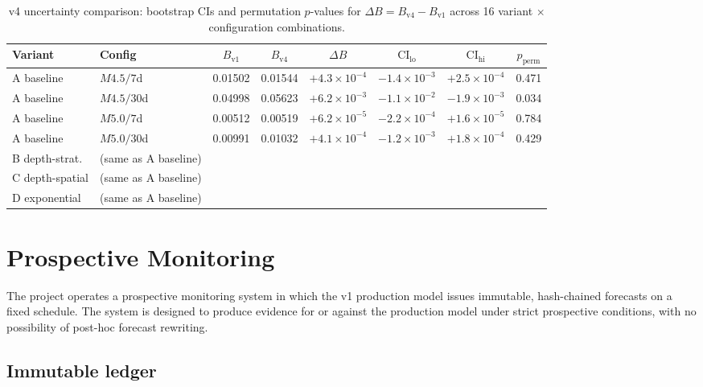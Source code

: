 \documentclass[10pt,a4paper,twocolumn]{article}
\begin{document}
\begin{table}[t]
\centering
\caption{v4 uncertainty comparison: bootstrap CIs and permutation $p$-values for $\Delta B = B_{\text{v4}} - B_{\text{v1}}$ across 16 variant $\times$ configuration combinations.}\label{tab:v4-uncertainty}
\small
\begin{tabular*}{\textwidth}{@{\extracolsep{\fill}}llcccccc}
\toprule
Variant & Config & $B_{\text{v1}}$ & $B_{\text{v4}}$ & $\Delta B$ & $\text{CI}_{\text{lo}}$ & $\text{CI}_{\text{hi}}$ & $p_{\text{perm}}$ \\
\midrule
A baseline        & $M4.5/7$d  & 0.01502 & 0.01544 & $+4.3\times10^{-4}$ & $-1.4\times10^{-3}$ & $+2.5\times10^{-4}$ & 0.471 \\
A baseline        & $M4.5/30$d & 0.04998 & 0.05623 & $+6.2\times10^{-3}$ & $-1.1\times10^{-2}$ & $-1.9\times10^{-3}$ & 0.034 \\
A baseline        & $M5.0/7$d  & 0.00512 & 0.00519 & $+6.2\times10^{-5}$ & $-2.2\times10^{-4}$ & $+1.6\times10^{-5}$ & 0.784 \\
A baseline        & $M5.0/30$d & 0.00991 & 0.01032 & $+4.1\times10^{-4}$ & $-1.2\times10^{-3}$ & $+1.8\times10^{-4}$ & 0.429 \\
B depth-strat.    & (same as A baseline) & & & & & & \\
C depth-spatial   & (same as A baseline) & & & & & & \\
D exponential     & (same as A baseline) & & & & & & \\
\bottomrule
\end{tabular*}
\end{table}

\section{Prospective Monitoring}\label{sec:prospective}

The project operates a prospective monitoring system in which the v1 production model issues immutable, hash-chained forecasts on a fixed schedule. The system is designed to produce evidence for or against the production model under strict prospective conditions, with no possibility of post-hoc forecast rewriting.

\subsection{Immutable ledger}
\end{document}
